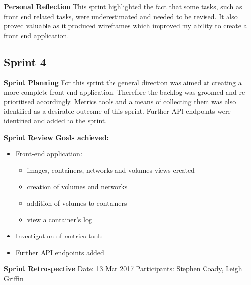 \underline{\textbf{Personal Reflection}}\newline
This sprint highlighted the fact that some tasks, such as front end related tasks, were underestimated and needed to be revised. It also proved valuable as it produced wireframes which improved my ability to create a front end application.

\subsection{Sprint 4}

\underline{\textbf{Sprint Planning}}\newline
For this sprint the general direction was aimed at creating a more complete front-end application. Therefore the backlog was groomed and re-prioritised accordingly. Metrics tools and a means of collecting them was also identified as a desirable outcome of this sprint. Further API endpoints were identified and added to the sprint.

\underline{\textbf{Sprint Review}}\newline
\textbf{Goals achieved:}
\begin{itemize}
	\item Front-end application:
	\begin{itemize}
		\item images, containers, networks and volumes views created
		\item creation of volumes and networks
		\item addition of volumes to containers
		\item view a container's log
	\end{itemize}
	\item Investigation of metrics tools
	\item Further API endpoints added
\end{itemize}

\underline{\textbf{Sprint Retrospective}}\newline
Date: 13 Mar 2017
Participants: Stephen Coady, Leigh Griffin

